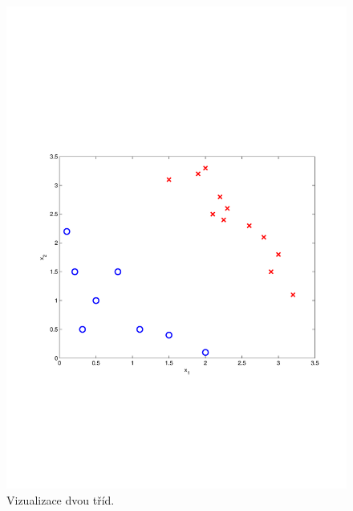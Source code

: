 \begin{figure}[!ht]
	\centering
	\begin{minipage}[b]{0.48\textwidth}
		\includegraphics[width = \textwidth, trim = 2.5cm 7cm 2cm 9cm]{./Img/BinarniRegrese/decisionBoundary/decisionBoundary1.pdf}
		\caption{Vizualizace dvou tříd. \\ ~}
		\label{fig:decisionBoundary1}
	\end{minipage}%
	\hfill
	\begin{minipage}[b]{0.48\textwidth}

\end{minipage}
\end{figure}
